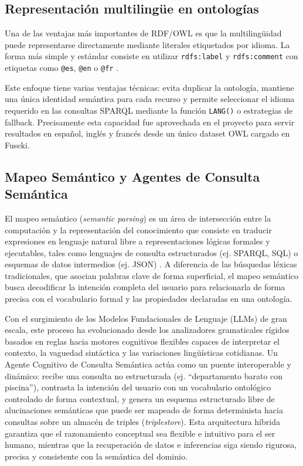 \subsection{Representación multilingüe en ontologías}

Una de las ventajas más importantes de RDF/OWL es que la multilingüidad puede
representarse directamente mediante literales etiquetados por idioma. La forma más
simple y estándar consiste en utilizar \texttt{rdfs:label} y \texttt{rdfs:comment}
con etiquetas como \texttt{@es}, \texttt{@en} o \texttt{@fr} \parencite{w3c-rdf2014}.

Este enfoque tiene varias ventajas técnicas: evita duplicar la ontología, mantiene una
  única identidad semántica para cada recurso y permite seleccionar el idioma requerido en
  las consultas SPARQL mediante la función \texttt{LANG()} o estrategias de fallback.
  Precisamente esta capacidad fue aprovechada en el proyecto para servir resultados en
  español, inglés y francés desde un único dataset OWL cargado en Fuseki.

\subsection{Mapeo Semántico y Agentes de Consulta Semántica}

El mapeo semántico (\textit{semantic parsing}) es un área de intersección entre la computación y la representación del conocimiento que consiste en traducir expresiones en lenguaje natural libre a representaciones lógicas formales y ejecutables, tales como lenguajes de consulta estructurados (ej. SPARQL, SQL) o esquemas de datos intermedios (ej. JSON) \parencite{baader2003}. A diferencia de las búsquedas léxicas tradicionales, que asocian palabras clave de forma superficial, el mapeo semántico busca decodificar la intención completa del usuario para relacionarla de forma precisa con el vocabulario formal y las propiedades declaradas en una ontología.

Con el surgimiento de los Modelos Fundacionales de Lenguaje (LLMs) de gran escala, este proceso ha evolucionado desde los analizadores gramaticales rígidos basados en reglas hacia motores cognitivos flexibles capaces de interpretar el contexto, la vaguedad sintáctica y las variaciones lingüísticas cotidianas. Un Agente Cognitivo de Consulta Semántica actúa como un puente interoperable y dinámico: recibe una consulta no estructurada (ej. ``departamento barato con piscina''), contrasta la intención del usuario con un vocabulario ontológico controlado de forma contextual, y genera un esquema estructurado libre de alucinaciones semánticas que puede ser mapeado de forma determinista hacia consultas sobre un almacén de triples (\textit{triplestore}). Esta arquitectura híbrida garantiza que el razonamiento conceptual sea flexible e intuitivo para el ser humano, mientras que la recuperación de datos e inferencias siga siendo rigurosa, precisa y consistente con la semántica del dominio.
